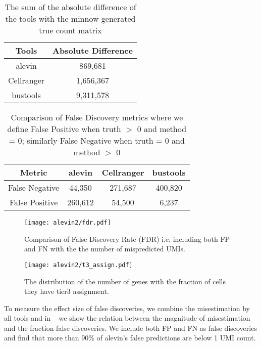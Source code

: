 \begin{table}[h!]
	\centering
	 \begin{tabular}{|| c | c||} 
		 \hline
		 Tools & Absolute Difference \\ [0.5ex] 
		 \hline\hline
		 alevin & 869,681 \\
		 \hline
		 Cellranger & 1,656,367 \\
		 \hline
		 bustools & 9,311,578 \\ [1ex] 
		 \hline
 	\end{tabular}
	\caption{The sum of the absolute difference of the tools with the minnow generated 
	true count matrix }
	\label{tab:matrix_diff}
\end{table}

\begin{table}[h!]
	\centering
	 \begin{tabular}{|| c | c | c | | c||} 
		 \hline
		 Metric & alevin & Cellranger & bustools \\ [0.5ex] 
		 \hline\hline
		 False Negative & 44,350 & 271,687 & 400,820 \\
		 \hline
		 False Positive & 260,612 & 54,500 & 6,237 \\ [1ex] 
		 \hline
 	\end{tabular}
	\caption{Comparison of False Discovery metrics where we define False Positive when truth 
	$>$ 0 and method = 0; similarly False Negative when truth = 0 and method $>$ 0}
	\label{tab:f1}
\end{table}

  \begin{figure}[!htb]
      \centering
    \texttt{[image: alevin2/fdr.pdf]}
    \caption{ Comparison of False Discovery Rate (FDR) i.e. including both FP and FN with the
	the number of mispredicted UMIs. }
    \label{fig:alv2_fdr}
  \end{figure}

  \begin{figure}[!htb]
      \centering
    \texttt{[image: alevin2/t3\_assign.pdf]}
    \caption{ The distribution of the number of genes with the fraction of cells they have tier3
	assignment.}
    \label{fig:alv2_t3}
  \end{figure}

To measure the effect size of false discoveries, we combine the misestimation by all tools
and in ~ we show the relation between the magnitude of misestimation and the fraction 
false discoveries. We include both FP and FN as false discoveries and find that more than 90\% of alevin's 
false predictions are below 1 UMI count. 

